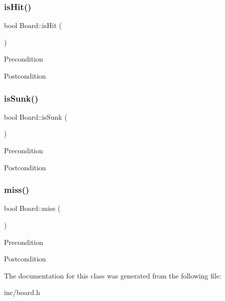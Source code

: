 \subsubsection{\texorpdfstring{isHit()}{isHit()}}
{\footnotesize\ttfamily bool Board\+::is\+Hit (\begin{DoxyParamCaption}{ }\end{DoxyParamCaption})}

\begin{DoxyPrecond}{Precondition}

\end{DoxyPrecond}
\begin{DoxyPostcond}{Postcondition}

\end{DoxyPostcond}
\mbox{\label{classBoard_a242488b02ce0a370c7648df567aa7ec0}} 
\subsubsection{\texorpdfstring{isSunk()}{isSunk()}}
{\footnotesize\ttfamily bool Board\+::is\+Sunk (\begin{DoxyParamCaption}{ }\end{DoxyParamCaption})}

\begin{DoxyPrecond}{Precondition}

\end{DoxyPrecond}
\begin{DoxyPostcond}{Postcondition}

\end{DoxyPostcond}
\mbox{\label{classBoard_a058b6c42434ce8f8f313cc78ebcaac74}} 
\subsubsection{\texorpdfstring{miss()}{miss()}}
{\footnotesize\ttfamily bool Board\+::miss (\begin{DoxyParamCaption}{ }\end{DoxyParamCaption})}

\begin{DoxyPrecond}{Precondition}

\end{DoxyPrecond}
\begin{DoxyPostcond}{Postcondition}

\end{DoxyPostcond}


The documentation for this class was generated from the following file\+:\begin{DoxyCompactItemize}
\item 
inc/board.\+h\end{DoxyCompactItemize}

